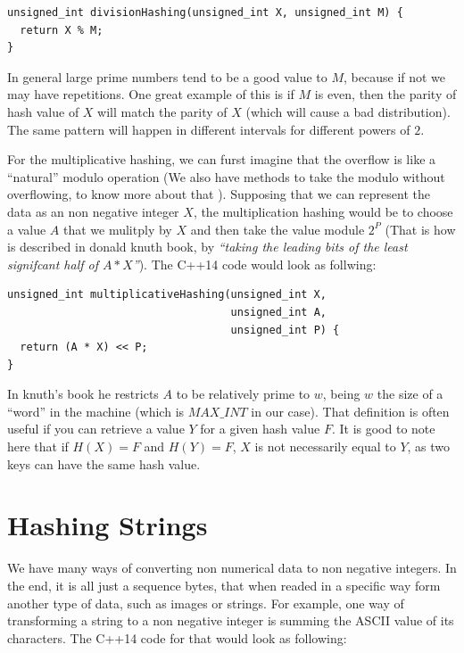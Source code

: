 \begin{lstlisting}
unsigned_int divisionHashing(unsigned_int X, unsigned_int M) {
  return X % M;
}
\end{lstlisting}

In general large prime numbers tend to be a good value to \( M \), because if not we may have repetitions. One great example of this is if \( M \) is even, then the parity of hash value of \( X \) will match the parity of \( X \) (which will cause a bad distribution). The same pattern will happen in different intervals for different powers of \( 2 \).

For the multiplicative hashing, we can furst imagine that the overflow is like a ``natural'' modulo operation (We also have methods to take the modulo without overflowing, to know more about that ). Supposing that we can represent the data as an non negative integer \( X \), the multiplication hashing would be to choose a value \( A \) that we mulitply by \( X \) and then take the value module \( 2^P \) (That is how is described in donald knuth book, by \textit{``taking the leading bits of the least signifcant half of \( A * X \)''}). The C++14 code would look as follwing:

\medskip

\begin{lstlisting}
unsigned_int multiplicativeHashing(unsigned_int X,
                                   unsigned_int A,
                                   unsigned_int P) {
  return (A * X) << P; 
}
\end{lstlisting}

In knuth's book he restricts \( A \) to be relatively prime to \( w \), being \( w \) the size of a ``word'' in the machine (which is \( MAX\_INT \) in our case). That definition is often useful if you can retrieve a value \( Y \) for a given hash value \( F \). It is good to note here that if \( H(X) = F \) and \( H(Y) = F \), \( X \) is not necessarily equal to \( Y \), as two keys can have the same hash value.

\section{Hashing Strings}

We have many ways of converting non numerical data to non negative integers. In the end, it is all just a sequence bytes, that when readed in a specific way form another type of data, such as images or strings. For example, one way of transforming a string to a non negative integer is summing the ASCII value of its characters. The C++14 code for that would look as following:

